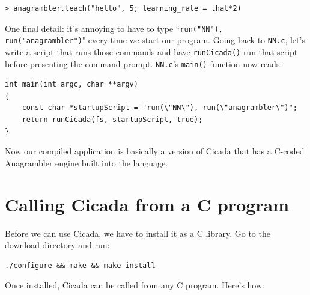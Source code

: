\documentclass{article}
\newenvironment{code}{
       \begin{list}{}{
               \setlength{\leftmargin}{.4in}
               \setlength{\rightmargin}{0in}
               \setlength{\topsep}{.2in}
       }
       \small
       \item[] }
       { \end{list}   }
\begin{document}
\begin{code} \begin{verbatim}
> anagrambler.teach("hello", 5; learning_rate = that*2)
\end{verbatim} \end{code}

One final detail: it's annoying to have to type ``\verb#run("NN"), run("anagrambler")#" every time we start our program.  Going back to \verb#NN.c#, let's write a script that runs those commands and have \verb#runCicada()# run that script before presenting the command prompt.  \verb#NN.c#'s \verb#main()# function now reads:

\begin{code} \begin{verbatim}
int main(int argc, char **argv)
{
    const char *startupScript = "run(\"NN\"), run(\"anagrambler\")";
    return runCicada(fs, startupScript, true);
}
\end{verbatim} \end{code}

\noindent Now our compiled application is basically a version of Cicada that has a C-coded Anagrambler engine built into the language.





\newpage

\section{Calling Cicada from a C program}

Before we can use Cicada, we have to install it as a C library.  Go to the download directory and run:

\begin{code} \begin{verbatim}
./configure && make && make install
\end{verbatim} \end{code}

\noindent Once installed, Cicada can be called from any C program.  Here's how:
\end{document}
